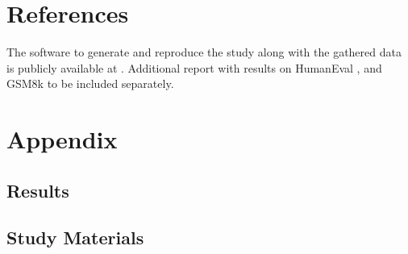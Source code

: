 \documentclass[11pt]{article}
\begin{document}

\section{References}

The software to generate and reproduce the study 
along with the gathered data is publicly available at 
\cite{Nair_Examining_Calibration_Large}. Additional 
report with results on HumanEval \cite{chen2021evaluating}, and GSM8k 
\cite{cobbe2021gsm8k} to be included separately.





\appendix
\section{Appendix}



\subsection{Results}



\subsection{Study Materials}

\label{sec:appendix}
\end{document}
